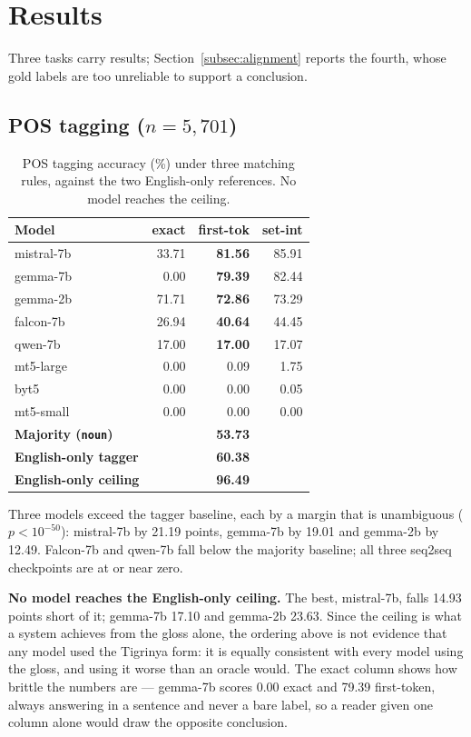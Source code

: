 \documentclass[11pt]{article}
\begin{document}
\section{Results}
\label{sec:results}

Three tasks carry results; Section~\ref{subsec:alignment} reports the fourth,
whose gold labels are too unreliable to support a conclusion.

\subsection{POS tagging ($n = 5{,}701$)}
\label{subsec:pos}

\begin{table}[tb]
\centering
\setlength{\tabcolsep}{4pt}
\begin{tabular}{lrrr}
\toprule
Model & exact & \textbf{first-tok} & set-int \\
\midrule
mistral-7b & 33.71 & \textbf{81.56} & 85.91 \\
gemma-7b   &  0.00 & \textbf{79.39} & 82.44 \\
gemma-2b   & 71.71 & \textbf{72.86} & 73.29 \\
falcon-7b  & 26.94 & \textbf{40.64} & 44.45 \\
qwen-7b    & 17.00 & \textbf{17.00} & 17.07 \\
mt5-large  &  0.00 &          0.09  &  1.75 \\
byt5       &  0.00 &          0.00  &  0.05 \\
mt5-small  &  0.00 &          0.00  &  0.00 \\
\midrule
\textbf{Majority (\texttt{noun})} & & \textbf{53.73} & \\
\textbf{English-only tagger}      & & \textbf{60.38} & \\
\textbf{English-only ceiling}     & & \textbf{96.49} & \\
\bottomrule
\end{tabular}
\caption{POS tagging accuracy (\%) under three matching rules, against the
two English-only references. No model reaches the ceiling.}
\label{tab:pos}
\end{table}

Three models exceed the tagger baseline, each by a margin that is
unambiguous ($p < 10^{-50}$): mistral-7b by 21.19 points, gemma-7b by 19.01
and gemma-2b by 12.49. Falcon-7b and qwen-7b fall below the majority baseline; all three
seq2seq checkpoints are at or near zero.

\textbf{No model reaches the English-only ceiling.} The best, mistral-7b,
falls 14.93 points short of it; gemma-7b 17.10 and gemma-2b 23.63. Since the
ceiling is what a system achieves from the gloss alone, the ordering above is
not evidence that any model used the Tigrinya form: it is equally consistent
with every model using the gloss, and using it worse than an oracle would.
The exact column shows how brittle the numbers are --- gemma-7b scores 0.00
exact and 79.39 first-token, always answering in a sentence and never a bare
label, so a reader given one column alone would draw the opposite
conclusion.
\end{document}
